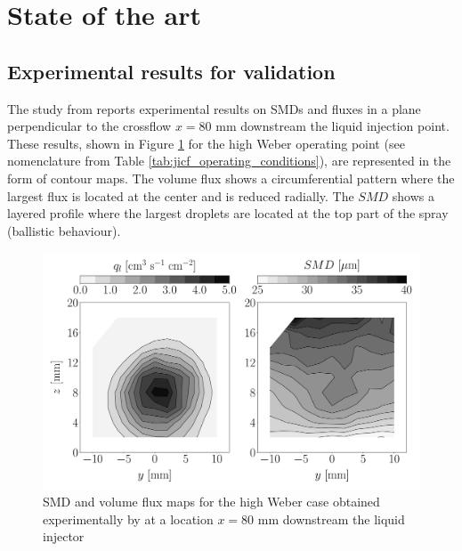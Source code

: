 \section{State of the art}
\label{sec:ch6_state_art}

\subsection{Experimental results for validation}
\label{sec:ch6_experimental_results}

The study from  reports experimental results on SMDs and fluxes in a plane perpendicular to the crossflow $x = 80$ mm downstream the liquid injection point. These results, shown in Figure \ref{fig:maps_Becker_expe_results} for the high Weber operating point (see nomenclature from Table \ref{tab:jicf_operating_conditions}), are represented in the form of contour maps.  The volume flux shows a circumferential pattern where the largest flux is located at the center and is reduced radially. The $SMD$ shows a layered profile where the largest droplets are located at the top part of the spray (ballistic behaviour).

\clearpage


\begin{figure}[h!]
\centering
   \includegraphics[scale=0.19]{./part2_developments/figures_ch6_lagrangian_JICF/expe_results/maps_UG100}
   \vspace*{-0.15in}
\caption{SMD and volume flux maps for the high Weber case obtained experimentally by  at a location $x = 80$ mm downstream the liquid injector}
\label{fig:maps_Becker_expe_results}
\end{figure}

